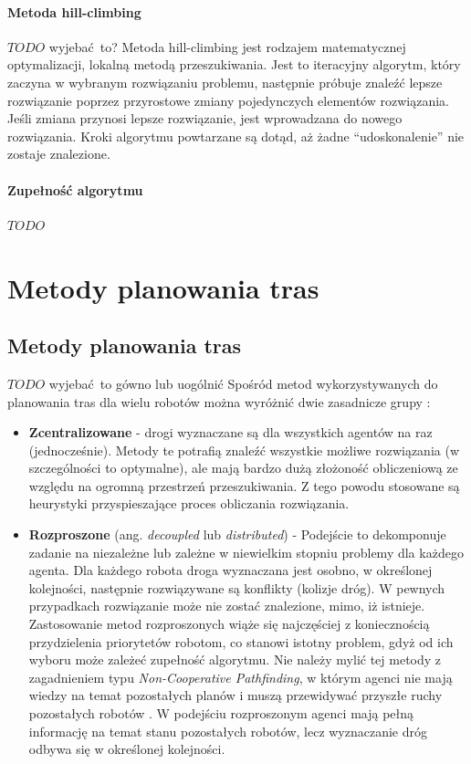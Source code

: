 \subsubsection{Metoda hill-climbing}
$TODO$ wyjebać to?
Metoda hill-climbing jest rodzajem matematycznej optymalizacji, lokalną metodą przeszukiwania.
Jest to iteracyjny algorytm, który zaczyna w wybranym rozwiązaniu problemu, następnie próbuje znaleźć lepsze rozwiązanie poprzez przyrostowe zmiany pojedynczych elementów rozwiązania.
Jeśli zmiana przynosi lepsze rozwiązanie, jest wprowadzana do nowego rozwiązania.
Kroki algorytmu powtarzane są dotąd, aż żadne ``udoskonalenie'' nie zostaje znalezione.

\subsubsection{Zupełność algorytmu}
$TODO$

\chapter{Metody planowania tras}
\label{ch:path_planning_methods}

\section{Metody planowania tras}
$TODO$ wyjebać to gówno lub uogólnić
Spośród metod wykorzystywanych do planowania tras dla wielu robotów można wyróżnić dwie zasadnicze grupy \cite{latombe}:
\begin{itemize}
	$TODO$ zcentralizowanie nie muszą być optymalne
	\item {\bf Zcentralizowane} - drogi wyznaczane są dla wszystkich agentów na raz (jednocześnie). Metody te potrafią znaleźć wszystkie możliwe rozwiązania (w szczególności to optymalne), ale mają bardzo dużą złożoność obliczeniową ze względu na ogromną przestrzeń przeszukiwania. Z tego powodu stosowane są heurystyki przyspieszające proces obliczania rozwiązania.
	\item {\bf Rozproszone} (ang. {\it decoupled} lub {\it distributed}) - Podejście to dekomponuje zadanie na niezależne lub zależne w niewielkim stopniu problemy dla każdego agenta. Dla każdego robota droga wyznaczana jest osobno, w określonej kolejności, następnie rozwiązywane są konflikty (kolizje dróg). W pewnych przypadkach rozwiązanie może nie zostać znalezione, mimo, iż istnieje. Zastosowanie metod rozproszonych wiąże się najczęściej z koniecznością przydzielenia priorytetów robotom, co stanowi istotny problem, gdyż od ich wyboru może zależeć zupełność algorytmu. Nie należy mylić tej metody z zagadnieniem typu {\it Non-Cooperative Pathfinding}, w którym agenci nie mają wiedzy na temat pozostałych planów i muszą przewidywać przyszłe ruchy pozostałych robotów \cite{cooppath}. W podejściu rozproszonym agenci mają pełną informację na temat stanu pozostałych robotów, lecz wyznaczanie dróg odbywa się w określonej kolejności.
\end{itemize}

